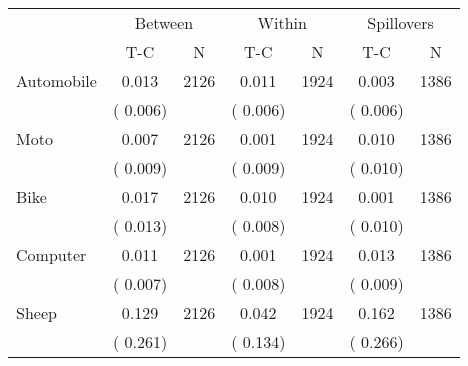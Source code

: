
\begin{tabular}{l*{6}{c}}\hline&\multicolumn{2}{c}{Between}&\multicolumn{2}{c}{Within}&\multicolumn{2}{c}{Spillovers} \\ \cmidrule(r){2-3}\cmidrule(l){4-5}\cmidrule(l){6-7} & {T-C} & {N} & {T-C} & {N}  & {T-C}  & {N}  \\ \midrule
Automobile        &              0.013      &       2126       &              0.011      &       1924       &              0.003      &       1386       \\
                       &       (       0.006)            &                               &       (       0.006)            &                               &       (       0.006)            &                               \\
Moto        &              0.007      &       2126       &              0.001      &       1924       &              0.010      &       1386       \\
                       &       (       0.009)            &                               &       (       0.009)            &                               &       (       0.010)            &                               \\
Bike        &              0.017      &       2126       &              0.010      &       1924       &              0.001      &       1386       \\
                       &       (       0.013)            &                               &       (       0.008)            &                               &       (       0.010)            &                               \\
Computer        &              0.011      &       2126       &              0.001      &       1924       &              0.013      &       1386       \\
                       &       (       0.007)            &                               &       (       0.008)            &                               &       (       0.009)            &                               \\
Sheep        &              0.129      &       2126       &              0.042      &       1924       &              0.162      &       1386       \\
                       &       (       0.261)            &                               &       (       0.134)            &                               &       (       0.266)            &                               \\

\end{tabular}
